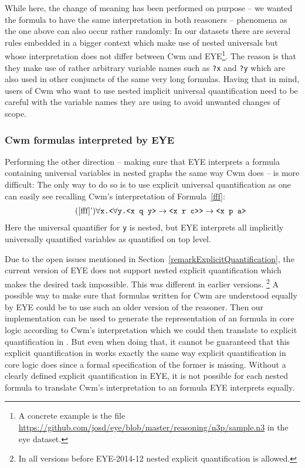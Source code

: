 While here, the change of meaning has been performed on purpose -- we wanted the formula to have the same interpretation in both reasoners --
phenomena as the one above can also occur rather randomly: In our datasets there are several rules embedded in a bigger context which make use of nested universals but whose
 interpretation does not differ between Cwm and EYE\footnote{A concrete example is the file \url{https://github.com/josd/eye/blob/master/reasoning/n3p/sample.n3} in the eye dataset.}. 
 The reason is that they make use of rather arbitrary variable names such as \texttt{?x} and \texttt{?y} 
which are also used in other conjuncts of the same very long formulas. Having that in mind, users of Cwm who want to use nested implicit universal quantification need to be careful
with the variable names they are using to avoid unwanted changes of scope.

\subsubsection{Cwm formulas interpreted by EYE}
Performing the other direction -- making sure that EYE interprets a formula containing universal variables in nested graphs the same way Cwm does -- is more difficult: 
The only way to do so is to use explicit universal quantification as one can easily see recalling Cwm's interpretation of Formula~\ref{fff}: 
\begin{multline}\tag{\ref{fff}'}
 \forall \texttt{x.}
 \texttt{<} \forall \texttt{y.<x q y>} \rightarrow \texttt{<x r c>{}>}\rightarrow\texttt{<x p a>}
\end{multline}
Here the universal quantifier for \texttt{y} is nested, but EYE interprets all implicitly universally quantified variables as quantified on top level.

Due to the open issues 
mentioned in Section~\ref{remarkExplicitQuantification}, the current version of EYE does not support nested explicit quantification which makes the desired task impossible.
This was different in earlier versions.%
\footnote{In all versions before EYE-2014-12
 nested explicit quantification is allowed.} 
A possible way to make sure that formulas written for Cwm are understood equally by EYE could be to use such an older version of the reasoner.
Then our implementation can be used to generate the representation of an \nthree formula in core logic according to Cwm's interpretation which we could then translate 
 to explicit quantification
in \nthree. But even when doing that, it cannot be guaranteed that this explicit quantification in \nthree works exactly the same way explicit quantification
in core logic does since a formal specification of the former is missing.
Without a clearly defined explicit quantification in EYE, it is not possible for each nested formula to translate Cwm's interpretation to an \nthree formula 
EYE interprets equally.


